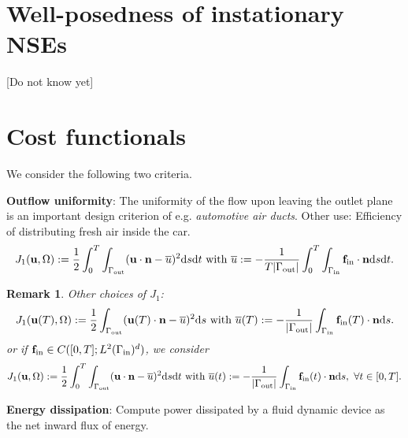 \documentclass[oneside,11pt]{book}
\numberwithin{equation}{section}
\newtheorem{remark}{Remark}[section]
\begin{document}
\section{Well-posedness of instationary NSEs}
[Do not know yet]

\section{Cost functionals}
We consider the following two criteria.

\textbf{Outflow uniformity}: The uniformity of the flow upon leaving the outlet plane is an important design criterion of e.g. \textit{automotive air ducts}. Other use: Efficiency of distributing fresh air inside the car.
\begin{align*}
    J_1({\bf u},\Omega) := \frac{1}{2}\int_0^T\int_{\Gamma_{\rm out}} ({\bf u}\cdot{\bf n} - \overline{u})^2{\rm d}s{\rm d}t \mbox{ with } \overline{u} := -\frac{1}{T|\Gamma_{\rm out}|}\int_0^T\int_{\Gamma_{\rm in}} {\bf f}_{\rm in}\cdot{\bf n}{\rm d}s{\rm d}t.
\end{align*}

\begin{remark}
    Other choices of $J_1$: 
    \begin{align}
        J_1({\bf u}(T),\Omega) := \frac{1}{2}\int_{\Gamma_{\rm out}} ({\bf u}(T)\cdot{\bf n} - \overline{u})^2{\rm d}s \mbox{ with } \overline{u}(T) := -\frac{1}{|\Gamma_{\rm out}|}\int_{\Gamma_{\rm in}} {\bf f}_{\rm in}(T)\cdot{\bf n}{\rm d}s.
    \end{align}
    or if ${\bf f}_{\rm in}\in C([0,T];L^2(\Gamma_{\rm in})^d)$, we consider
    \begin{align}
        J_1({\bf u},\Omega) := \frac{1}{2}\int_0^T\int_{\Gamma_{\rm out}} ({\bf u}\cdot{\bf n} - \overline{u})^2{\rm d}s{\rm d}t \mbox{ with } \overline{u}(t) := -\frac{1}{|\Gamma_{\rm out}|}\int_{\Gamma_{\rm in}} {\bf f}_{\rm in}(t)\cdot{\bf n}{\rm d}s,\ \forall t\in[0,T].
    \end{align}
\end{remark}
\textbf{Energy dissipation}: Compute power dissipated by a fluid dynamic device as the net inward flux of energy.
\end{document}
